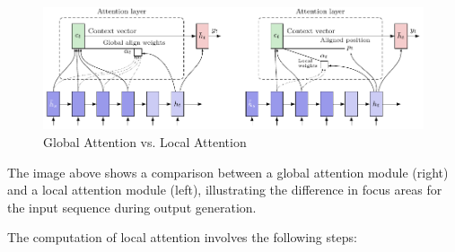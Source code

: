 \begin{figure}[!htbp]
    \centering
    \includegraphics[width=\linewidth]{tikz/chapter7 - Local Attention Comparison.pdf}
    \caption{Global Attention vs. Local Attention}
\end{figure}

The image above shows a comparison between a global attention module (right) and a local attention module (left), illustrating the difference in focus areas for the input sequence during output generation.

The computation of local attention involves the following steps:

